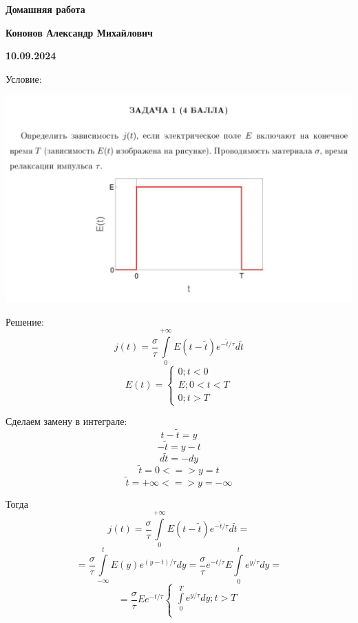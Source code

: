 \documentclass[12pt]{article}
\begin{document}
\begin{large}
\begin{center}
\LARGE \textbf{Домашняя работа}
\par
\LARGE \textbf{Кононов Александр Михайлович}
\par
    \textbf{10.09.2024}
\end{center}
\par Условие:
\par
\includegraphics[width=\textwidth]{photo.jpg}
\par Решение:
\[
    j(t) = \frac{\sigma}{\tau} \int\limits_0^{+\infty} E(t-\widetilde{t} ) e^{-\widetilde{t}/\tau} d \widetilde{t}
\]
\[
    E(t) =
    \begin{cases}
        0; t < 0
        \\
        E; 0 < t < T
        \\
        0; t > T
    \end{cases}
\]
\par Сделаем замену в интеграле:
\[
    t - \widetilde{t} = y
\]
\[
    - \widetilde{t} = y - t
\]
\[
    d \widetilde{t} = -dy
\]
\[
    \widetilde{t} = 0 <=> y = t
\]
\[
    \widetilde{t} = + \infty <=> y = - \infty
\]
\par Тогда
\[
    j(t) = \frac{\sigma}{\tau} \int\limits_0^{+\infty} E(t-\widetilde{t} ) e^{-\widetilde{t}/\tau} d \widetilde{t} =
\]
\[
    = \frac{\sigma}{\tau} \int\limits_{-\infty}^{t} E(y) e^{(y-t)/\tau} dy = \frac{\sigma}{\tau} e^{-t/\tau} E \int\limits_{0}^{t} e^{y/\tau}dy =
\]
\[
    = \frac{\sigma}{\tau} E e^{-t/\tau}
    \begin{cases}
        \int\limits_{0}^{T} e^{y/\tau} dy ; t > T
        \\

\end{cases}\]
\end{large}
\end{document}

